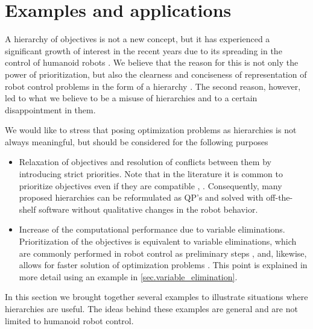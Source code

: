 \section{Examples and applications}\label{sec.pllso_examples}

A hierarchy of objectives is not a new concept, but it has experienced a
significant growth of interest in the recent years due to its spreading in the
control of humanoid robots \cite{Kanoun2009thesis, Saab2013tro,
Sentis2007thesis}. We believe that the reason for this is not only the power of
prioritization, but also the clearness and conciseness of representation of
robot control problems in the form of a hierarchy \cite{Dimitrov2014jrs}. The
second reason, however, led to what we believe to be a misuse of hierarchies
and to a certain disappointment in them.


We would like to stress that posing optimization problems as hierarchies is not
always meaningful, but should be considered for the following purposes
%
\begin{itemize}
    \item Relaxation of objectives and resolution of conflicts between them by
        introducing strict priorities. Note that in the literature it is common
        to prioritize objectives even if they are compatible
        \cite[Chapter~5]{Sentis2007thesis}, \cite{Dietrich2015ijrr,
        Saab2013tro}. Consequently, many proposed hierarchies can be
        reformulated as \ac{QP}'s and solved with off-the-shelf software
        without qualitative changes in the robot behavior.

    \item Increase of the computational performance due to variable
        eliminations. Prioritization of the objectives is equivalent to
        variable eliminations, which are commonly performed in robot control as
        preliminary steps \cite{Dimitrov2014jrs}, and, likewise, allows for
        faster solution of optimization problems \cite{Dimitrov2015preprint}.
        This point is explained in more detail using an example in
        \cref{sec.variable_elimination}.
\end{itemize}
%
In this section we brought together several examples to illustrate situations
where hierarchies are useful. The ideas behind these examples are general and
are not limited to humanoid robot control.



